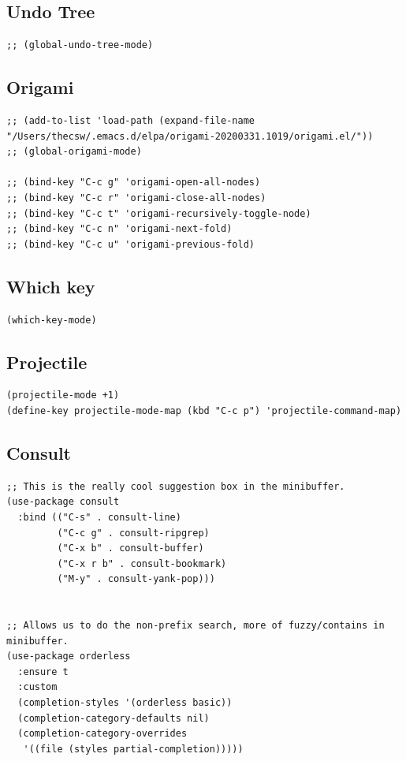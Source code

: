 \documentclass[10pt]{article}
\begin{document}
\subsection{Undo Tree}
\label{sec:orgc8beb11}
\begin{verbatim}
;; (global-undo-tree-mode)
\end{verbatim}
\subsection{Origami}
\label{sec:org591f5af}
\begin{verbatim}
;; (add-to-list 'load-path (expand-file-name "/Users/thecsw/.emacs.d/elpa/origami-20200331.1019/origami.el/"))
;; (global-origami-mode)

;; (bind-key "C-c g" 'origami-open-all-nodes)
;; (bind-key "C-c r" 'origami-close-all-nodes)
;; (bind-key "C-c t" 'origami-recursively-toggle-node)
;; (bind-key "C-c n" 'origami-next-fold)
;; (bind-key "C-c u" 'origami-previous-fold)
\end{verbatim}
\subsection{Which key}
\label{sec:org12ed434}
\begin{verbatim}
(which-key-mode)
\end{verbatim}
\subsection{Projectile}
\label{sec:orgedc1745}
\begin{verbatim}
(projectile-mode +1)
(define-key projectile-mode-map (kbd "C-c p") 'projectile-command-map)
\end{verbatim}
\subsection{Consult}
\label{sec:org36ebe7d}
\begin{verbatim}
;; This is the really cool suggestion box in the minibuffer.
(use-package consult
  :bind (("C-s" . consult-line)
         ("C-c g" . consult-ripgrep)
         ("C-x b" . consult-buffer)
         ("C-x r b" . consult-bookmark)
         ("M-y" . consult-yank-pop)))


;; Allows us to do the non-prefix search, more of fuzzy/contains in minibuffer.
(use-package orderless
  :ensure t
  :custom
  (completion-styles '(orderless basic))
  (completion-category-defaults nil)
  (completion-category-overrides
   '((file (styles partial-completion)))))
\end{verbatim}
\end{document}
